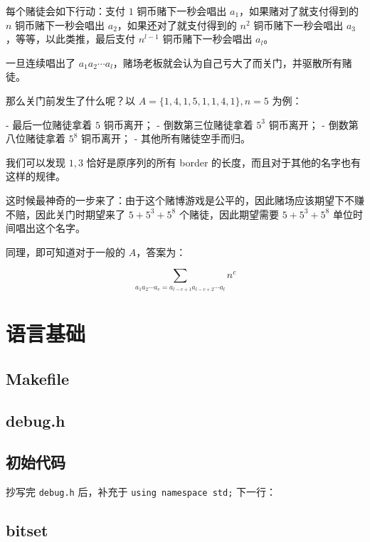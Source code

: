 \documentclass[12pt]{ctexart}
\begin{document}
每个赌徒会如下行动：支付 $1$ 铜币赌下一秒会唱出 $a_1$，如果赌对了就支付得到的 $n$ 铜币赌下一秒会唱出 $a_2$，如果还对了就支付得到的 $n^2$ 铜币赌下一秒会唱出 $a_3$，等等，以此类推，最后支付 $n^{l-1}$ 铜币赌下一秒会唱出 $a_l$。

一旦连续唱出了 $a_1a_2\cdots a_l$，赌场老板就会认为自己亏大了而关门，并驱散所有赌徒。

那么关门前发生了什么呢？以 $A=\{1,4,1,5,1,1,4,1\},n=5$ 为例：

- 最后一位赌徒拿着 $5$ 铜币离开；
- 倒数第三位赌徒拿着 $5^3$ 铜币离开；
- 倒数第八位赌徒拿着 $5^8$ 铜币离开；
- 其他所有赌徒空手而归。

我们可以发现 $1,3$ 恰好是原序列的所有 border 的长度，而且对于其他的名字也有这样的规律。

这时候最神奇的一步来了：由于这个赌博游戏是公平的，因此赌场应该期望下不赚不赔，因此关门时期望来了 $5+5^3+5^8$ 个赌徒，因此期望需要 $5+5^3+5^8$ 单位时间唱出这个名字。

同理，即可知道对于一般的 $A$，答案为：

$$\sum\limits_{a_1a_2\cdots a_c=a_{l-c+1}a_{l-c+2}\cdots a_l} n^c$$


\newpage

\section{语言基础}

\subsection{Makefile}


\subsection{debug.h}



\subsection{初始代码}



抄写完 \verb|debug.h| 后，补充于 \verb|using namespace std;| 下一行：




\subsection{bitset}
\end{document}
